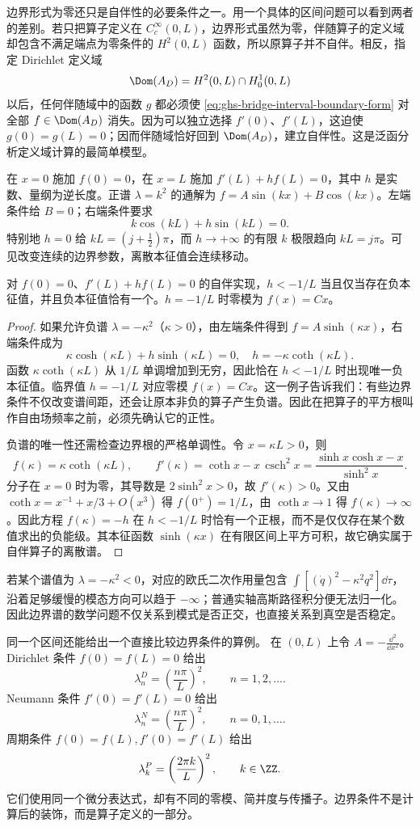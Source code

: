 边界形式为零还只是自伴性的必要条件之一。用一个具体的区间问题可以看到两者的差别。若只把算子定义在 $C_c^\infty(0,L)$，边界形式虽然为零，伴随算子的定义域却包含不满足端点为零条件的 $H^2(0,L)$ 函数，所以原算子并不自伴。相反，指定 Dirichlet 定义域
\[
 \Dom(A_D)=H^2(0,L)\cap H_0^1(0,L)
\]
以后，任何伴随域中的函数 $g$ 都必须使 \cref{eq:ghs-bridge-interval-boundary-form} 对全部 $f\in\Dom(A_D)$ 消失。因为可以独立选择 $f'(0)$、$f'(L)$，这迫使 $g(0)=g(L)=0$；因而伴随域恰好回到 $\Dom(A_D)$，建立自伴性。这是泛函分析定义域计算的最简单模型。

在 $x=0$ 施加 $f(0)=0$，在 $x=L$ 施加 $f'(L)+hf(L)=0$，其中 $h$ 是实数、量纲为逆长度。正谱 $\lambda=k^2$ 的通解为 $f=A\sin(kx)+B\cos(kx)$。左端条件给 $B=0$；右端条件要求
\begin{equation}\label{eq:ghs-bridge-robin-quantization}
 k\cos(kL)+h\sin(kL)=0.
\end{equation}
特别地 $h=0$ 给 $kL=(j+\frac12)\pi$，而 $h\to+\infty$ 的有限 $k$ 极限趋向 $kL=j\pi$。可见改变连续的边界参数，离散本征值会连续移动。

\begin{proposition}
对 $f(0)=0$、$f'(L)+hf(L)=0$ 的自伴实现，$h<-1/L$ 当且仅当存在负本征值，并且负本征值恰有一个。$h=-1/L$ 时零模为 $f(x)=Cx$。
\end{proposition}
\begin{proof}
如果允许负谱 $\lambda=-\kappa^2$（$\kappa>0$），由左端条件得到 $f=A\sinh(\kappa x)$，右端条件成为
\[
 \kappa\cosh(\kappa L)+h\sinh(\kappa L)=0,
 \quad h=-\kappa\coth(\kappa L).
\]
函数 $\kappa\coth(\kappa L)$ 从 $1/L$ 单调增加到无穷，因此恰在 $h<-1/L$ 时出现唯一负本征值。临界值 $h=-1/L$ 对应零模 $f(x)=Cx$。这一例子告诉我们：有些边界条件不仅改变谱间距，还会让原本非负的算子产生负谱。因此在把算子的平方根叫作自由场频率之前，必须先确认它的正性。



负谱的唯一性还需检查边界根的严格单调性。令 $x=\kappa L>0$，则
\[
 f(\kappa)=\kappa\coth(\kappa L),\qquad
 f'(\kappa)=\coth x-x\,\operatorname{csch}^2x
 =\frac{\sinh x\cosh x-x}{\sinh^2x}.
\]
分子在 $x=0$ 时为零，其导数是 $2\sinh^2x>0$，故 $f'(\kappa)>0$。又由 $\coth x=x^{-1}+x/3+O(x^3)$ 得 $f(0^+)=1/L$，由 $\coth x\to1$ 得 $f(\kappa)\to\infty$。因此方程 $f(\kappa)=-h$ 在 $h<-1/L$ 时恰有一个正根，而不是仅仅存在某个数值求出的负能级。其本征函数 $\sinh(\kappa x)$ 在有限区间上平方可积，故它确实属于自伴算子的离散谱。

\end{proof}

若某个谱值为 $\lambda=-\kappa^2<0$，对应的欧氏二次作用量包含 $\int[(\dot q)^2-\kappa^2q^2]\dd\tau$，沿着足够缓慢的模态方向可以趋于 $-\infty$；普通实轴高斯路径积分便无法归一化。因此边界谱的数学问题不仅关系到模式是否正交，也直接关系到真空是否稳定。

同一个区间还能给出一个直接比较边界条件的算例。
在 $(0,L)$ 上令 $A=-\frac{\dd^2}{\dd x^2}$。Dirichlet 条件 $f(0)=f(L)=0$ 给出
\[
 \lambda_n^{D}=\left(\frac{n\pi}{L}\right)^2,\qquad n=1,2,\ldots.
\]
Neumann 条件 $f'(0)=f'(L)=0$ 给出
\[
 \lambda_n^{N}=\left(\frac{n\pi}{L}\right)^2,\qquad n=0,1,\ldots.
\]
周期条件 $f(0)=f(L),f'(0)=f'(L)$ 给出
\[
 \lambda_k^{P}=\left(\frac{2\pi k}{L}\right)^2,\qquad k\in\ZZ.
\]
它们使用同一个微分表达式，却有不同的零模、简并度与传播子。边界条件不是计算后的装饰，而是算子定义的一部分。
